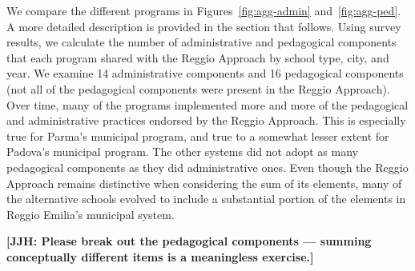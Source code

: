 We compare the different programs in Figures~\ref{fig:agg-admin} and~\ref{fig:agg-ped}. A more detailed description is provided in the section that follows. Using survey results, we calculate the number of administrative and pedagogical components that each program shared with the Reggio Approach by school type, city, and year. We examine 14 administrative components and 16 pedagogical components (not all of the pedagogical components were present in the Reggio Approach). Over time, many of the programs implemented more and more of the pedagogical and administrative practices endorsed by the Reggio Approach. This is especially true for Parma's municipal program, and true to a somewhat lesser extent for Padova's municipal program. The other systems did not adopt as many pedagogical components as they did administrative ones. Even though the Reggio Approach remains distinctive when considering the sum of its elements, many of the alternative schools evolved to include a substantial portion of the elements in Reggio Emilia's municipal system.

\textbf{[JJH: Please break out the pedagogical components --- summing conceptually different items is a meaningless exercise.]}

